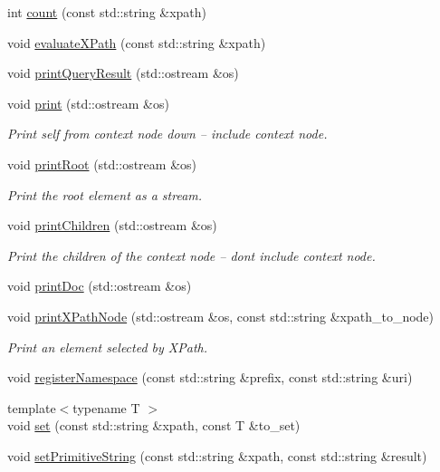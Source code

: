 \begin{DoxyCompactItemize}
\item 
int \mbox{\hyperlink{classXMLXPathReader_1_1BasicXPathReader_a2ae482dc6df0839bcfb96dc3539e4ce4}{count}} (const std\+::string \&xpath)
\item 
void \mbox{\hyperlink{classXMLXPathReader_1_1BasicXPathReader_a4aaa7102c9f6a8d5ca3adc574f06ce8b}{evaluate\+X\+Path}} (const std\+::string \&xpath)
\item 
void \mbox{\hyperlink{classXMLXPathReader_1_1BasicXPathReader_a719ba9bbd4ae77d6be9a6544a2d0ccaf}{print\+Query\+Result}} (std\+::ostream \&os)
\item 
void \mbox{\hyperlink{classXMLXPathReader_1_1BasicXPathReader_a846e0ac9b2835040cb615a9585e2a999}{print}} (std\+::ostream \&os)
\begin{DoxyCompactList}\small\item\em Print self from context node down -- include context node. \end{DoxyCompactList}\item 
void \mbox{\hyperlink{classXMLXPathReader_1_1BasicXPathReader_abc0bfad898a5b01d2251d7aaacbbb507}{print\+Root}} (std\+::ostream \&os)
\begin{DoxyCompactList}\small\item\em Print the root element as a stream. \end{DoxyCompactList}\item 
void \mbox{\hyperlink{classXMLXPathReader_1_1BasicXPathReader_a980f4e08d97855479d47e5b10205075e}{print\+Children}} (std\+::ostream \&os)
\begin{DoxyCompactList}\small\item\em Print the children of the context node -- dont include context node. \end{DoxyCompactList}\item 
void \mbox{\hyperlink{classXMLXPathReader_1_1BasicXPathReader_ab4607adfbae13b0ce3c7e5b944342207}{print\+Doc}} (std\+::ostream \&os)
\item 
void \mbox{\hyperlink{classXMLXPathReader_1_1BasicXPathReader_afba694dbda7c2e1c26ca344085bfffb6}{print\+X\+Path\+Node}} (std\+::ostream \&os, const std\+::string \&xpath\+\_\+to\+\_\+node)
\begin{DoxyCompactList}\small\item\em Print an element selected by X\+Path. \end{DoxyCompactList}\item 
void \mbox{\hyperlink{classXMLXPathReader_1_1BasicXPathReader_a5991605f4cda926b146829be5798b037}{register\+Namespace}} (const std\+::string \&prefix, const std\+::string \&uri)
\item 
{\footnotesize template$<$typename T $>$ }\\void \mbox{\hyperlink{classXMLXPathReader_1_1BasicXPathReader_a4cf7407f107bf4f307b70af4cccbd30e}{set}} (const std\+::string \&xpath, const T \&to\+\_\+set)
\item 
void \mbox{\hyperlink{classXMLXPathReader_1_1BasicXPathReader_a76d2a9f9bc292c92558619e47b85dd4c}{set\+Primitive\+String}} (const std\+::string \&xpath, const std\+::string \&result)
\end{DoxyCompactItemize}



